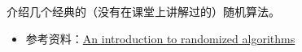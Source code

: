 \documentclass[a4paper, justified]{tufte-handout}
\begin{document}


\begin{ot}[经典随机算法介绍.]
	介绍几个经典的（没有在课堂上讲解过的）随机算法。
	\begin{itemize}
		\item 参考资料：\href{https://immorlica.com/randAlg/Karp91.pdf}{An introduction to randomized algorithms}
	\end{itemize}
\end{ot}


% 




\beginfb

% 
% 
\end{document}

